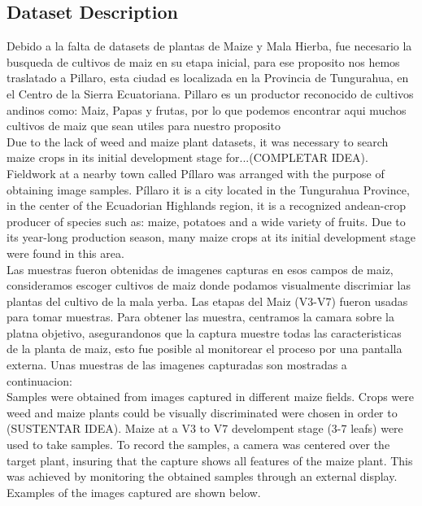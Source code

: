 \documentclass[conference]{IEEEtran}
\begin{document}
\subsection{Dataset Description}

Debido a la falta de datasets de plantas de Maize y Mala Hierba, fue necesario la busqueda de cultivos de maiz en su etapa inicial, para ese proposito nos hemos traslatado a Pillaro, esta ciudad es localizada en la Provincia de Tungurahua, en el Centro de la Sierra Ecuatoriana. Pillaro es un productor reconocido de  cultivos andinos como: Maiz, Papas y frutas, por lo que podemos encontrar aqui muchos cultivos de maiz que sean utiles para nuestro proposito \\

Due to the lack of weed and maize plant datasets, it was necessary to search maize crops in its initial development stage for...(COMPLETAR IDEA). Fieldwork at a nearby town called P\'illaro was arranged with the purpose of obtaining image samples. P\'illaro it is a city located in the Tungurahua Province, in the center of the Ecuadorian Highlands region, it is a recognized andean-crop producer of species such as: maize, potatoes and a wide variety of fruits. Due to its year-long production season, many maize crops at its initial development stage were found in this area. \\

Las muestras fueron obtenidas de imagenes capturas en esos campos de maiz, consideramos escoger cultivos de maiz donde podamos visualmente discrimiar las plantas del cultivo de la mala yerba. Las etapas del Maiz (V3-V7) fueron usadas para tomar muestras. Para obtener las muestra, centramos la camara sobre la platna objetivo, asegurandonos que la captura muestre todas las caracteristicas de la planta de maiz, esto fue posible al monitorear el proceso por una pantalla externa. Unas muestras de las imagenes capturadas son mostradas a continuacion: \\

Samples were obtained from images captured in different maize fields. Crops were weed and maize plants could be visually discriminated were chosen in order to (SUSTENTAR IDEA). Maize at a V3 to V7 develompent stage (3-7 leafs) \cite{fassio1998maiz} were used to take samples. To record the samples, a camera was centered over the target plant, insuring that the capture shows all features of the maize plant. This was achieved by monitoring the obtained samples through an external display. Examples of the images captured are shown below. 
\end{document}
